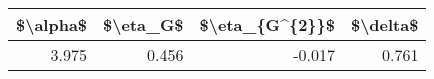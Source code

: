 \begin{tabular}{rrrr}
\toprule
 \$\textbackslash alpha\$ &  \$\textbackslash eta\_G\$ &  \$\textbackslash eta\_\{G\textasciicircum \{2\}\}\$ &  \$\textbackslash delta\$ \\
\midrule
    3.975 &     0.456 &          -0.017 &     0.761 \\
\bottomrule
\end{tabular}
